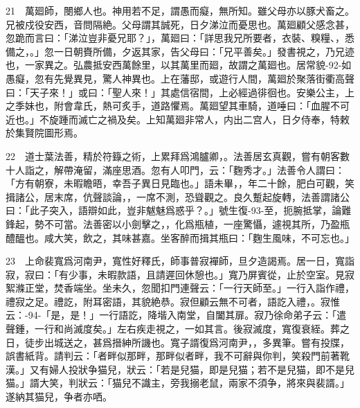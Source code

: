 \documentclass[UTF8,scheme=chinese]{ctexbook}
\newcommand{\pagenum}{\footnotesize\heiti\color{red}}
\begin{document}
\vspace{1.5em}

21　萬廻師，閿鄉人也。神用若不足，謂愚而癡，無所知。雖父母亦以豚犬畜之。兄被戍役安西，音問隔絶。父母謂其誠死，日夕涕泣而憂思也。萬廻顧父感念甚，忽跪而言曰：「涕泣豈非憂兄耶？」，萬廻曰：「詳思我兄所要者，衣裝、糗糧、，悉備之，。」忽一日朝賚所備，夕返其家，告父母曰：「兄平善矣。」發書視之，乃兄迹也，一家異之。弘農抵安西萬餘里，以其萬里而廻，故謂之萬廻也。居常貌{\pagenum -92-}如愚癡，忽有先覺異見，驚人神異也。上在藩邸，或遊行人間，萬廻於聚落街衢高聲曰：「天子來！」或曰：「聖人來！」其處信宿間，上必經過徘徊也。安樂公主，上之季妹也，附會韋氏，熱可炙手，道路懼焉。萬廻望其車騎，道唾曰：「血腥不可近也。」不旋踵而滅亡之禍及矣。上知萬廻非常人，内出二宫人，日夕侍奉，特敕於集賢院圖形焉。

\vspace{1.5em}

22　道士葉法善，精於符籙之術，上累拜爲鴻臚卿，。法善居玄真觀，嘗有朝客數十人詣之，解帶淹留，滿座思酒。忽有人叩門，云：「麴秀才。」法善令人謂曰：「方有朝寮，未暇瞻晤，幸吾子異日見臨也。」語未畢，，年二十餘，肥白可觀，笑揖諸公，居末席，伉聲談論，，一席不測，恐聳觀之。良久蹔起旋轉，法善謂諸公曰：「此子突入，語辯如此，豈非魃魅爲惑乎？。」號生復{\pagenum -93-}至，扼腕抵掌，論難鋒起，勢不可當。法善密以小劍擊之，，化爲瓶植，一座驚懾，遽視其所，乃盈瓶醴醞也。咸大笑，飲之，其味甚嘉。坐客醉而揖其瓶曰：「麴生風味，不可忘也。」

\vspace{1.5em}

23　上命裴寬爲河南尹，寬性好釋氏，師事普寂襌師，旦夕造謁焉。居一日，寬詣寂，寂曰：「有少事，未暇款語，且請遲回休憩也。」寬乃屏賓從，止於空室。見寂絮滌正堂，焚香端坐。坐未久，忽聞扣門連聲云：「一行天師至。」一行入詣作禮，禮寂之足。禮訖，附耳密語，其貌絶恭。寂但顧云無不可者，語訖入禮，。寂惟云：{\pagenum -94-}「是，是！」一行語訖，降堦入南堂，自闔其扉。寂乃徐命弟子云：「遣聲鍾，一行和尚滅度矣。」左右疾走視之，一如其言。後寂滅度，寬復衰絰。葬之日，徒步出城送之，甚爲搢紳所譏也。寬子諝復爲河南尹，，多異筆。嘗有投牒，誤書紙背。請判云：「者畔似那畔，那畔似者畔，我不可辭與你判，笑殺門前著靴漢。」又有婦人投狀争猫兒，狀云：「若是兒猫，即是兒猫；若不是兒猫，即不是兒猫。」諝大笑，判狀云：「猫兒不識主，旁我搦老鼠，兩家不須争，將來與裴諝。」遂納其猫兒，争者亦哂。
\end{document}
